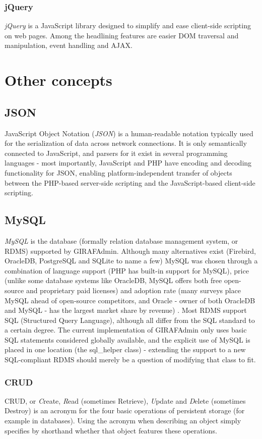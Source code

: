 \subsubsection*{jQuery}
\emph{jQuery} is a JavaScript library designed to simplify and ease client-side scripting on web pages. Among the headlining features are easier DOM traversal and manipulation, event handling and AJAX.

\section{Other concepts}

\subsection*{JSON}
JavaScript Object Notation (\emph{JSON}) is a human-readable notation typically used for the serialization of data across network connections. It is only semantically connected to JavaScript, and parsers for it exist in several programming languages - most importantly, JavaScript and PHP have encoding and decoding functionality for JSON, enabling platform-independent transfer of objects between the PHP-based server-side scripting and the JavaScript-based client-side scripting.

\subsection*{MySQL}
\emph{MySQL} is the database (formally relation database management system, or RDMS) supported by GIRAFAdmin. Although many alternatives exist (Firebird, OracleDB, PostgreSQL and SQLite to name a few) MySQL was chosen through a combination of language support (PHP has built-in support for MySQL), price (unlike some database systems like OracleDB, MySQL offers both free open-source and proprietary paid licenses) and adoption rate (many surveys place MySQL ahead of open-source competitors, and Oracle - owner of both OracleDB and MySQL - has the largest market share by revenue) \cite{mysqlpenetration}\cite{mysqlmarketshare}. Most RDMS support SQL (Structured Query Language), although all differ from the SQL standard to a certain degree. The current implementation of GIRAFAdmin only uses basic SQL statements considered globally available, and the explicit use of MySQL is placed in one location (the sql\_helper class) - extending the support to a new SQL-compliant RDMS should merely be a question of modifying that class to fit.

\subsubsection*{CRUD}
CRUD, or \emph{C}reate, \emph{R}ead (sometimes Retrieve), \emph{U}pdate and \emph{D}elete (sometimes Destroy) is an acronym for the four basic operations of persistent storage (for example in databases). Using the acronym when describing an object simply specifies by shorthand whether that object features these operations.